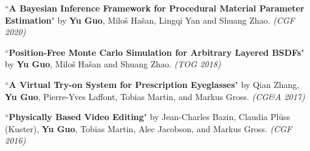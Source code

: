 \documentclass[margin,line]{resume}
\begin{document}
\begin{resume}
	\vspace{-5mm}
	
	``\textbf{A Bayesian Inference Framework for Procedural Material Parameter Estimation}" 
	by \textbf{Yu Guo}, Milo\v{s} Ha\v{s}an, Lingqi Yan and Shuang Zhao. 
	\textsl{(CGF 2020)}\\
	
	\vspace{-5mm}
	
	``\textbf{Position-Free Monte Carlo Simulation for Arbitrary Layered BSDFs}" 
	by \textbf{Yu Guo}, Milo\v{s} Ha\v{s}an and Shuang Zhao. 
	\textsl{(TOG 2018)}\\
	
	\vspace{-5mm}
	
	``\textbf{A Virtual Try-on System for Prescription Eyeglasses}" 
	by Qian Zhang, \textbf{Yu Guo}, Pierre-Yves Laffont, Tobias Martin, and Markus Gross. 
	\textsl{(CG\&A 2017)}\\
	
	\vspace{-5mm}
	
%	
	
	``\textbf{Physically Based Video Editing}" 
	by Jean-Charles Bazin, Claudia Pl\"{u}ss (Kuster), \textbf{Yu Guo}, Tobias Martin, Alec Jacobson, and Markus Gross. 
	\textsl{(CGF 2016)}\\
	
	
%	
%	
%	
	

\end{resume}
\end{document}
